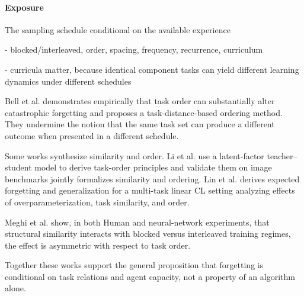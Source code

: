 \documentclass{article}
\begin{document}

            \paragraph{Exposure}

    
            The sampling schedule conditional on the available experience
            
            - blocked/interleaved, order, spacing, frequency, recurrence, curriculum
            
    
            - curricula matter, because identical component tasks can yield different learning dynamics under different schedules

                Bell et al. \cite{bell2022effect} demonstrates empirically that task order can substantially alter catastrophic forgetting and proposes a task-distance-based ordering method. They undermine the notion that the same task set can produce a different outcome when presented in a different schedule. 

                Some works synthesize similarity and order.
                Li et al. \cite{li2025optimal} use a latent-factor teacher–student model to derive task-order principles and validate them on image benchmarks jointly formalizes similarity and ordering. Lin et al. \cite{lin2023theory} derives expected forgetting and generalization for a multi-task linear CL setting analyzing effects of overparameterization, task similarity, and order.
                
                Meghi et al. \cite{menghi2025impact} show, in both Human and neural-network experiments, that structural similarity interacts with blocked versus interleaved training regimes, the effect is asymmetric with respect to task order. 
                
                Together these works support the general proposition that forgetting is conditional on task relations and agent capacity, not a property of an algorithm alone.
                
\end{document}
